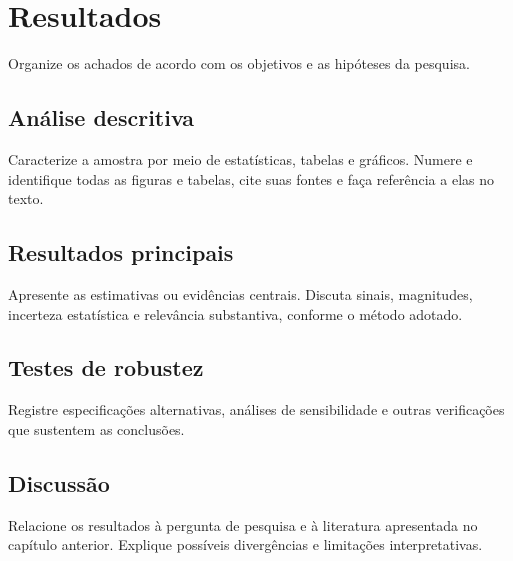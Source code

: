 \chapter{Resultados}

Organize os achados de acordo com os objetivos e as hipóteses da pesquisa.

\section{Análise descritiva}

Caracterize a amostra por meio de estatísticas, tabelas e gráficos. Numere e
identifique todas as figuras e tabelas, cite suas fontes e faça referência a
elas no texto.

\section{Resultados principais}

Apresente as estimativas ou evidências centrais. Discuta sinais, magnitudes,
incerteza estatística e relevância substantiva, conforme o método adotado.

\section{Testes de robustez}

Registre especificações alternativas, análises de sensibilidade e outras
verificações que sustentem as conclusões.

\section{Discussão}

Relacione os resultados à pergunta de pesquisa e à literatura apresentada no
capítulo anterior. Explique possíveis divergências e limitações interpretativas.

